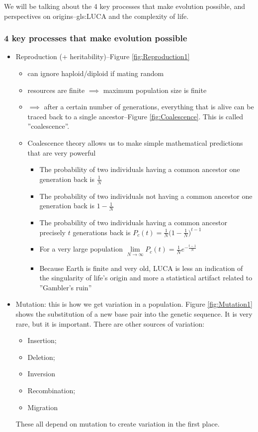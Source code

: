 \documentclass[]{article}
\begin{document}
We will be talking about the 4 key processes that make evolution possible, and perspectives on origins--\gls{gls:LUCA} and the complexity of life.

\subsubsection{4 key processes that make evolution possible}

\begin{itemize}
	\item Reproduction (+ heritability)--Figure \ref{fig:Reproduction1}
	\begin{itemize}
		\item can ignore haploid/diploid if mating random
		\item resources are finite $\implies$ maximum population size is finite
		\item $\implies$ after a certain number of generations, everything that is alive can be traced back to a single ancestor--Figure \ref{fig:Coalescence}. This is called ''coalescence''.
		\item Coalescence theory allows us to make simple mathematical predictions that are very powerful
		\begin{itemize}
			\item The probability of two individuals having a common ancestor one generation back is $\frac{1}{N}$
			\item The probability of two individuals not having a common ancestor one generation back is $1-\frac{1}{N}$
			\item The probability of two individuals having a common ancestor precisely $t$ generations back is $P_c(t)=\frac{1}{N}\big(1-\frac{1}{N}\big)^{t-1}$
			\item For a very large population $\lim\limits_{N\rightarrow \infty} P_c(t)=\frac{1}{N}e^{-\frac{t-1}{N}}$
			\item Because Earth is finite and very old, LUCA is less an
			indication of the singularity of life’s origin and more a
			statistical artifact related to ''Gambler’s ruin''
		\end{itemize}
	
	\end{itemize}
	\item Mutation: this is how we get variation in a population. Figure \ref{fig:Mutation1} shows the substitution of a new base pair into the genetic sequence. It is very rare, but it is important. There are other sources of variation:
	\begin{itemize}
		\item  Insertion;
		\item Deletion;
		\item Inversion
		\item Recombination;
		\item Migration
	\end{itemize}
	These all depend on mutation to create variation in the first place.


\end{itemize}
\end{document}
